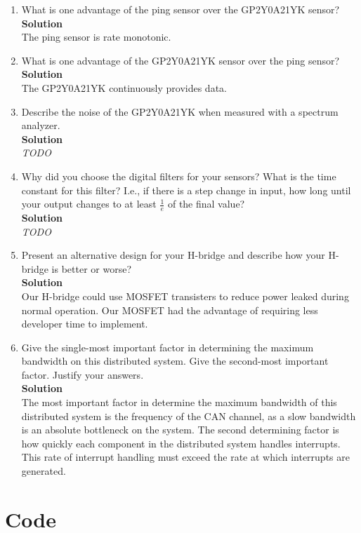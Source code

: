 \documentclass[12pt]{article}
\renewcommand{\Solnlabel}[1]{\textbf{Solution}\quad}
\newcommand{\todo}{\hfill{\LARGE \emph{\color{red}TODO}}}
\begin{document}
\begin{enumerate}[1)]
\item What is one advantage of the ping sensor over the GP2Y0A21YK
  sensor? \\ \Solnlabel \newline \\
  The ping sensor is rate monotonic.
\item What is one advantage of the GP2Y0A21YK sensor over the ping
  sensor? \\ \Solnlabel \newline \\
  The GP2Y0A21YK continuously provides data.
\item Describe the noise of the GP2Y0A21YK when measured with a
  spectrum analyzer. \\ \Solnlabel \newline \\
  \todo
\item Why did you choose the digital filters for your sensors? What is
  the time constant for this filter? I.e., if there is a step change
  in input, how long until your output changes to at least $\frac{1}{e}$ of the
  final value? \\ \Solnlabel \newline \\
  \todo
\item Present an alternative design for your H-bridge and describe how
  your H-bridge is better or worse? \\ \Solnlabel \newline \\
  Our H-bridge could use MOSFET transisters to reduce power leaked
  during normal operation. Our MOSFET had the advantage of requiring
  less developer time to implement.
\item Give the single-most important factor in determining the maximum
  bandwidth on this distributed system.  Give the second-most
  important factor. Justify your answers. \\ \Solnlabel \newline \\
  The most important factor in determine the maximum bandwidth of this
  distributed system is the frequency of the CAN channel, as a slow
  bandwidth is an absolute bottleneck on the system. The second
  determining factor is how quickly each component in the distributed
  system handles interrupts. This rate of interrupt handling must
  exceed the rate at which interrupts are generated.
\end{enumerate}

\newpage
\section{Code}

\end{document}
